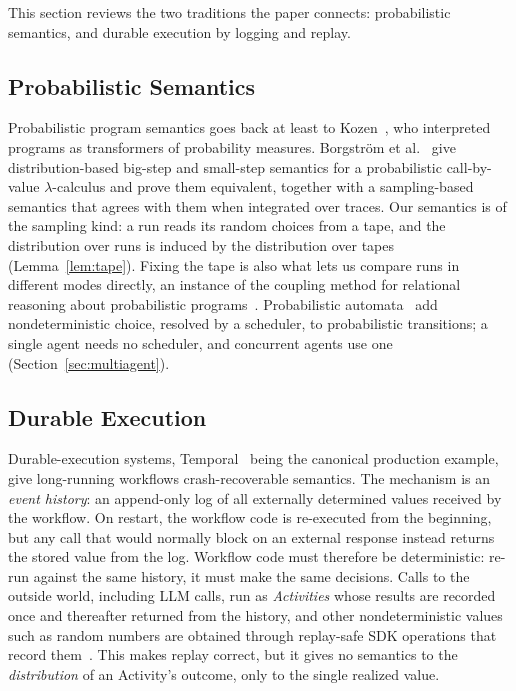 
This section reviews the two traditions the paper connects: probabilistic semantics, and
durable execution by logging and replay.

\subsection{Probabilistic Semantics}
\label{sec:bg-prob}

Probabilistic program semantics goes back at least to Kozen~\citep{kozen1981semantics}, who
interpreted programs as transformers of probability measures.
Borgstr\"{o}m et al.~\citep{borgstrom2016probabilistic} give distribution-based big-step and
small-step semantics for a probabilistic call-by-value $\lambda$-calculus and prove them
equivalent, together with a sampling-based semantics that agrees with them when integrated over
traces.
Our semantics is of the sampling kind: a run reads its random choices from a tape, and the
distribution over runs is induced by the distribution over tapes (Lemma~\ref{lem:tape}).
Fixing the tape is also what lets us compare runs in different modes directly, an instance of
the coupling method for relational reasoning about probabilistic
programs~\citep{barthe2015coupling}.
Probabilistic automata~\citep{segala1995probabilistic} add nondeterministic choice, resolved by
a scheduler, to probabilistic transitions; a single agent needs no scheduler, and concurrent
agents use one (Section~\ref{sec:multiagent}).

\subsection{Durable Execution}
\label{sec:bg-durable}

Durable-execution systems, Temporal~\citep{temporal2024docs} being the canonical production
example, give long-running workflows crash-recoverable semantics.
The mechanism is an \emph{event history}: an append-only log of all externally determined
values received by the workflow.
On restart, the workflow code is re-executed from the beginning, but any call that would
normally block on an external response instead returns the stored value from the log.
Workflow code must therefore be deterministic: re-run against the same history, it must make
the same decisions.
Calls to the outside world, including LLM calls, run as \emph{Activities} whose results are
recorded once and thereafter returned from the history, and other nondeterministic values such
as random numbers are obtained through replay-safe SDK operations that record
them~\citep{temporal2026sideeffects}.
This makes replay correct, but it gives no semantics to the \emph{distribution} of an
Activity's outcome, only to the single realized value.

